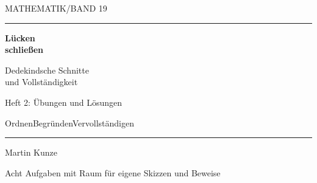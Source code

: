 \documentclass[a4paper,10pt]{article}
\begin{document}
\hypertarget{cuts.exercises}{}
{\sffamily\small MATHEMATIK\quad /\quad BAND 19}\par
\vspace{3mm}\hrule\vspace{9mm}
{\fontsize{29}{32}\selectfont\bfseries Lücken\\schließen\par}
\vspace{6mm}
{\Large Dedekindsche Schnitte\\und Vollständigkeit\par}
\vspace{3mm}
{\normalsize Heft 2: Übungen und Lösungen\par}
\vspace{16mm}
\begin{center}\CutsCoverFigure\end{center}
\vfill
{\sffamily\small Ordnen\quad\textbullet\quad Begründen\quad\textbullet\quad Vervollständigen\par}
\vspace{5mm}\hrule\vspace{3mm}
{\large Martin Kunze\par}
{\small Acht Aufgaben mit Raum für eigene Skizzen und Beweise\par}
\clearpage

\end{document}

